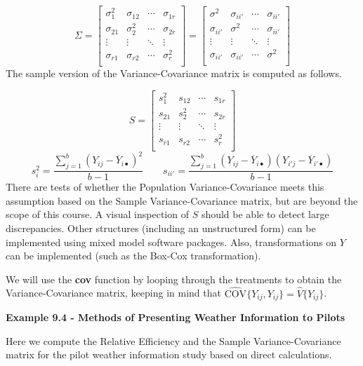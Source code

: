 \documentclass[
]{book}
\begin{document}
\[
\Sigma = 
\begin{bmatrix}
\sigma_1^2 & \sigma_{12} & \cdots & \sigma_{1r} \\
\sigma_{21} & \sigma_2^2 & \cdots & \sigma_{2r} \\
\vdots & \vdots & \ddots & \vdots \\
\sigma_{r1} & \sigma_{r2} & \cdots & \sigma_r^2 \\
\end{bmatrix}
=
\begin{bmatrix}
\sigma^2 & \sigma_{ii'} & \cdots & \sigma_{ii'} \\
\sigma_{ii'} & \sigma^2 & \cdots & \sigma_{ii'} \\
\vdots & \vdots & \ddots & \vdots \\
\sigma_{ii'} & \sigma_{ii'} & \cdots & \sigma^2 \\
\end{bmatrix}
\] The sample version of the Variance-Covariance matrix is computed as
follows.

\[
S = 
\begin{bmatrix}
s_1^2 & s_{12} & \cdots & s_{1r} \\
s_{21} & s_2^2 & \cdots & s_{2r} \\
\vdots & \vdots & \ddots & \vdots \\
s_{r1} & s_{r2} & \cdots & s_r^2 \\
\end{bmatrix}
\] \[
s_i^2 = 
\frac{\sum_{j=1}^b\left(Y_{ij}-\overline{Y}_{i\bullet}\right)^2}{b-1}
\qquad
s_{ii'} = 
\frac{\sum_{j=1}^b\left(Y_{ij}-\overline{Y}_{i\bullet}\right)
                  \left(Y_{i'j}-\overline{Y}_{i'\bullet}\right)}{b-1}
\] There are tests of whether the Population Variance-Covariance meets
this assumption based on the Sample Variance-Covariance matrix, but are
beyond the scope of this course. A visual inspection of \(S\) should be
able to detect large discrepancies. Other structures (including an
unstructured form) can be implemented using mixed model software
packages. Also, transformations on \(Y\) can be implemented (such as the
Box-Cox transformation).

We will use the \textbf{cov} function by looping through the treatments
to obtain the Variance-Covariance matrix, keeping in mind that
\(\hat{\mbox{COV}}\{Y_{ij},Y_{ij}\}=\hat{V}\{Y_{ij}\}\).

\textbf{Example 9.4 - Methods of Presenting Weather Information to
Pilots}

Here we compute the Relative Efficiency and the Sample
Variance-Covariance matrix for the pilot weather information study based
on direct calculations.
\end{document}
